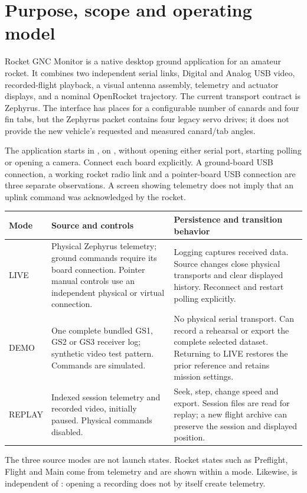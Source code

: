 \section{Purpose, scope and operating model}\label{sec:scope}
Rocket GNC Monitor is a native desktop ground application for an amateur rocket.
It combines two independent serial links, Digital and Analog USB video, recorded-flight playback,
a visual antenna assembly, telemetry and actuator displays, and a nominal
OpenRocket trajectory. The current transport contract is Zephyrus. The interface
has places for a configurable number of canards and four fin tabs, but the
Zephyrus packet contains four legacy servo drives; it does not provide the new
vehicle's requested and measured canard/tab angles.

The application starts in , on , without opening either
serial port, starting polling or opening a camera. Connect each board explicitly.
A ground-board USB connection, a working rocket radio link and a pointer-board
USB connection are three separate observations. A screen showing telemetry does
not imply that an uplink command was acknowledged by the rocket.

\begin{longtable}{@{}L{.13\linewidth}L{.38\linewidth}L{.42\linewidth}@{}}
\toprule Mode & Source and controls & Persistence and transition behavior \\\midrule\endhead
LIVE & Physical Zephyrus telemetry; ground commands require its board connection. Pointer manual controls use an independent physical or virtual connection. & Logging captures received data. Source changes close physical transports and clear displayed history. Reconnect and restart polling explicitly. \\
DEMO & One complete bundled GS1, GS2 or GS3 receiver log; synthetic video test pattern. Commands are simulated. & No physical serial transport. Can record a rehearsal or export the complete selected dataset. Returning to LIVE restores the prior reference and retains mission settings. \\
REPLAY & Indexed session telemetry and recorded video, initially paused. Physical commands disabled. & Seek, step, change speed and export. Session files are read for replay; a new flight archive can preserve the session and displayed position. \\
\bottomrule
\end{longtable}

The three source modes are not launch states. Rocket states such as Preflight,
Flight and Main come from telemetry and are shown within a mode. Likewise,
 is independent of : opening a recording does
not by itself create telemetry.

